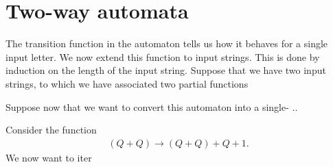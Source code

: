 \section{Two-way automata}  

The transition function in the automaton tells us how it behaves for a single input letter. We now extend this function to input strings. This is done by induction on the length of the input string. Suppose that we have two input strings, to which we have associated two partial functions 

Suppose now that we want to convert this automaton into a single- ..


Consider the function 
\begin{align*}
(Q+Q) \to (Q + Q) + Q + 1.
\end{align*}
We now want to iter
